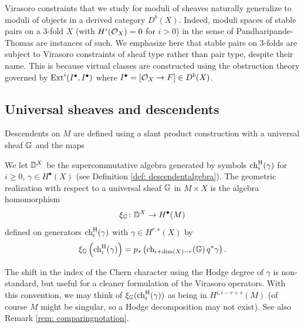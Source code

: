 \documentclass[a4paper, 12pt]{amsart}
\begin{document}
\begin{remark}\label{rem: stablepairsPT}
Virasoro constraints that we study for moduli of sheaves naturally generalize to moduli of objects in a derived category $D^b(X)$. Indeed, moduli spaces of stable pairs on a 3-fold $X$ (with $H^i({\mathcal O}_X)=0$ for $i>0$) in the sense of Pandharipande-Thomas \cite{PT} are instances of such. We emphasize here that stable pairs on 3-folds are subject to Virasoro constraints of sheaf type rather than pair type, despite their name. This is because virtual classes are constructed using the obstruction theory governed by $\textup{Ext}^i(I^\bullet,I^\bullet)$ where $I^\bullet=[{\mathcal O}_X\to F]\in D^b(X)$. 

\end{remark}


\subsection{Universal sheaves and descendents}
\label{sec: descendents}
Descendents on $M$ are defined using a slant product construction with a universal sheaf ${\mathbb{G}}$ and the maps

\begin{center}
\end{center}

\begin{definition}\label{def: geometricrealization}
We let ${\mathbb{D}}^X$ be the supercommutative algebra generated by symbols $\mathrm{ch}^{\mathrm{H}}_i(\gamma)$ for $i\geq 0$, $\gamma\in H^\bullet(X)$ (see Definition \ref{def: descendentalgebra}). The geometric realization with respect to a universal sheaf ${\mathbb{G}}$ in $M\times X$ is the algebra homomorphism 
\[\xi_{\mathbb{G}}\colon {\mathbb{D}}^X\to H^\bullet(M)\]
defined on generators $\mathrm{ch}^{\mathrm{H}}_i(\gamma)$ with $\gamma\in H^{r,s}(X)$ by 
\[\xi_{\mathbb{G}}\left(\mathrm{ch}_i^{\mathrm{H}}(\gamma)\right)=p_\ast\left(\mathrm{ch}_{i+\dim(X)-r}({\mathbb{G}})\,q^\ast \gamma\right).\]
\end{definition}
The shift in the index of the Chern character using the Hodge degree of $\gamma$ is non-standard, but useful for a cleaner formulation of the Virasoro operators. With this convention, we may think of $\xi_{\mathbb{G}}(\mathrm{ch}_i^{\mathrm{H}}(\gamma))$ as being in $H^{i, i-r+s}(M)$ (of course $M$ might be singular, so a Hodge decomposition may not exist). See also Remark \ref{rem: comparingnotation}. 
\end{document}
